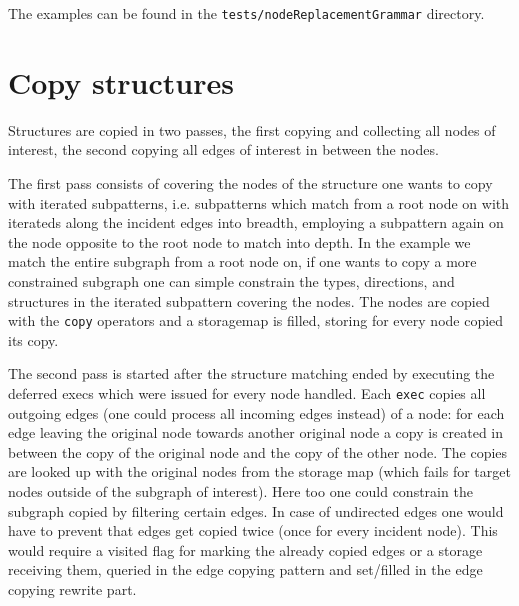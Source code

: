 The examples can be found in the \texttt{tests/nodeReplacementGrammar} directory.


\section{Copy structures}\label{subsub:copystructure}
Structures are copied in two passes, the first copying and collecting all nodes of interest, the second copying all edges of interest in between the nodes.

The first pass consists of covering the nodes of the structure one wants to copy with iterated subpatterns,
i.e. subpatterns which match from a root node on with iterateds along the incident edges into breadth,
employing a subpattern again on the node opposite to the root node to match into depth.
In the example we match the entire subgraph from a root node on, if one wants to copy a more constrained subgraph one can simple constrain the types, directions, and structures in the iterated subpattern covering the nodes.
The nodes are copied with the \texttt{copy} operators and a storagemap is filled, storing for every node copied its copy.

The second pass is started after the structure matching ended by executing the deferred execs which were issued for every node handled.
Each \texttt{exec} copies all outgoing edges (one could process all incoming edges instead) of a node:
for each edge leaving the original node towards another original node a copy is created in between the copy of the original node and the copy of the other node.
The copies are looked up with the original nodes from the storage map (which fails for target nodes outside of the subgraph of interest).
Here too one could constrain the subgraph copied by filtering certain edges.
In case of undirected edges one would have to prevent that edges get copied twice (once for every incident node). This would require a visited flag for marking the already copied edges or a storage receiving them, queried in the edge copying pattern and set/filled in the edge copying rewrite part.

